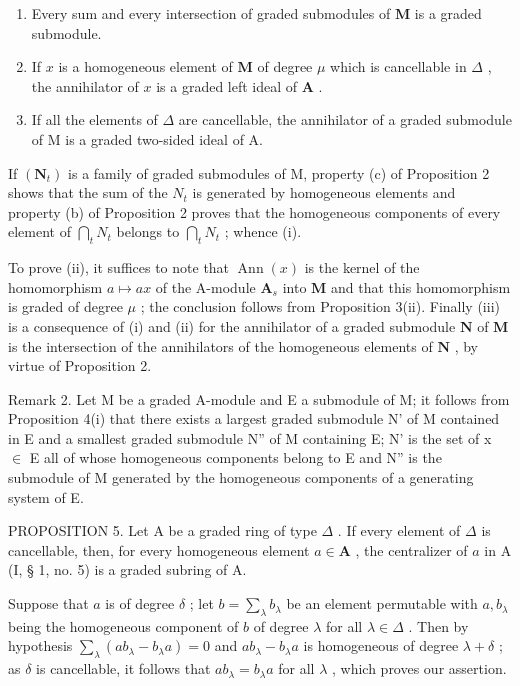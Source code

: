 \begin{enumerate}
\def\labelenumi{(\roman{enumi})}
\item
  Every sum and every intersection of graded submodules of \(\mathbf{M}\) is a graded submodule.
\item
  If \(x\) is a homogeneous element of \(\mathbf{M}\) of degree \(\mu\) which is cancellable in \(\Delta\) , the annihilator of \(x\) is a graded left ideal of \(\mathbf{A}\) .
\item
  If all the elements of \(\Delta\) are cancellable, the annihilator of a graded submodule of M is a graded two-sided ideal of A.
\end{enumerate}

If \((\mathbf{N}_{t})\) is a family of graded submodules of M, property (c) of Proposition 2 shows that the sum of the \(N_{t}\) is generated by homogeneous elements and property (b) of Proposition 2 proves that the homogeneous components of every element of \(\bigcap_{t} N_{t}\) belongs to \(\bigcap_{t} N_{t}\) ; whence (i).

To prove (ii), it suffices to note that \(\operatorname{Ann}(x)\) is the kernel of the homomorphism \(a \mapsto ax\) of the A-module \(\mathbf{A}_s\) into \(\mathbf{M}\) and that this homomorphism is graded of degree \(\mu\) ; the conclusion follows from Proposition 3(ii). Finally (iii) is a consequence of (i) and (ii) for the annihilator of a graded submodule \(\mathbf{N}\) of \(\mathbf{M}\) is the intersection of the annihilators of the homogeneous elements of \(\mathbf{N}\) , by virtue of Proposition 2.

Remark 2. Let M be a graded A-module and E a submodule of M; it follows from Proposition 4(i) that there exists a largest graded submodule N' of M contained in E and a smallest graded submodule N'' of M containing E; N' is the set of x \ensuremath{\in} E all of whose homogeneous components belong to E and N'' is the submodule of M generated by the homogeneous components of a generating system of E.

PROPOSITION 5. Let A be a graded ring of type \(\Delta\) . If every element of \(\Delta\) is cancellable, then, for every homogeneous element \(a \in \mathbf{A}\) , the centralizer of \(a\) in A (I, § 1, no. 5) is a graded subring of A.

Suppose that \(a\) is of degree \(\delta\) ; let \(b = \sum_{\lambda} b_{\lambda}\) be an element permutable with \(a, b_{\lambda}\) being the homogeneous component of \(b\) of degree \(\lambda\) for all \(\lambda \in \Delta\) . Then by hypothesis \(\sum_{\lambda} (ab_{\lambda} - b_{\lambda}a) = 0\) and \(ab_{\lambda} - b_{\lambda}a\) is homogeneous of degree \(\lambda + \delta\) ; as \(\delta\) is cancellable, it follows that \(ab_{\lambda} = b_{\lambda}a\) for all \(\lambda\) , which proves our assertion.


